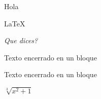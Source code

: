 \documentclass{article}
\begin{document}
Hola

\LaTeX
\begin{center}
\emph{Que dices?}
\end{center}

{
	\ttfamily
	Texto encerrado en un bloque
}
{
	\begin{ttfamily}
		Texto encerrado en un bloque
	\end{ttfamily}
}

$\sqrt[3]{x^2+1}$
\end{document}
